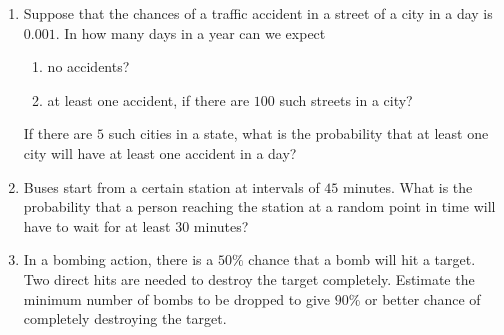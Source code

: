\documentclass[svgnames]{amsart}
\begin{document}
\begin{enumerate}[leftmargin=*, itemsep=0.3em]
\item Suppose that the chances of a traffic accident in a street of a city in a day is $0.001$. In how many days in a year can we expect
\begin{enumerate}
    \item no accidents?
    \item at least one accident, if there are $100$ such streets in a city?
\end{enumerate}
If there are $5$ such cities in a state, what is the probability that at least one city will have at least one accident in a day?

\item Buses start from a certain station at intervals of $45$ minutes. What is the probability that a person reaching the station at a random point in time will have to wait for at least $30$ minutes?

\item In a bombing action, there is a $50\%$ chance that a bomb will hit a target. Two direct hits are needed to destroy the target completely. Estimate the minimum number of bombs to be dropped to give $90\%$ or better chance of completely destroying the target.
\end{enumerate}
\end{document}
